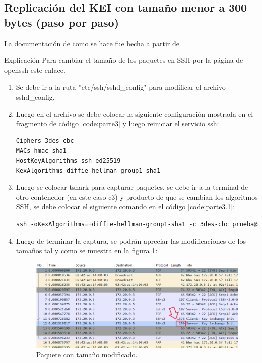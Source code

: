 \documentclass[letter,12pt]{article}
\newcounter{codecount}
\begin{document}
\subsection{Replicación del KEI con tamaño menor a 300 bytes (paso por paso)}

La documentación de como se hace fue hecha a partir de     \item Explicación Para cambiar el tamaño de los paquetes en SSH por la página de openssh \href{https://www.openssh.com/legacy.html}{este enlace}.

\begin{enumerate}
    \item Se debe ir a la ruta ''etc/ssh/sshd\_config" para modificar el archivo sshd\_config.

    \item Luego en el archivo se debe colocar la siguiente configuración mostrada en el fragmento de código \ref{code:parte3} y luego reiniciar el servicio ssh:

    
\label{code:parte3}
\begin{lstlisting}[language=Dockerfile, caption={Modificación del archivo sshd\_config}]
Ciphers 3des-cbc
MACs hmac-sha1
HostKeyAlgorithms ssh-ed25519
KexAlgorithms diffie-hellman-group1-sha1
\end{lstlisting}

\item Luego se colocar tshark para capturar paquetes, se debe ir a la terminal de otro contenedor (en este caso c3) y producto de que se cambian los algoritmos SSH, se debe colocar el siguiente comando en el código \ref{code:parte3.1}:

\label{code:parte3.1}
\begin{lstlisting}[language=Dockerfile, caption={Terminal de otro contenedor (c3 en este caso)}]
ssh -oKexAlgorithms=+diffie-hellman-group1-sha1 -c 3des-cbc prueba@c4\_s1

\end{lstlisting}

\item Luego de terminar la captura, se podrán apreciar las modificaciones de los tamaños tal y como se muestra en la figura \ref{fig:parte3}:

\begin{figure}[H]
    \centering
    \includegraphics[width=1\linewidth]{Images/parte 3/parte3.png}
    \caption{Paquete con tamaño modificado.}
    \label{fig:parte3}
\end{figure}


\end{enumerate}
\end{document}
